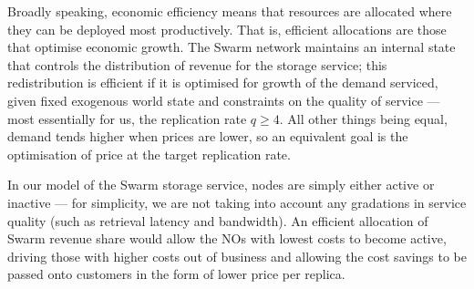 Broadly speaking, economic efficiency means that resources are allocated where they can be deployed most productively.
%
That is, efficient allocations are those that optimise economic growth.
%
The Swarm network maintains an internal state that controls the distribution of revenue for the storage service; this redistribution is efficient if it is optimised for growth of the demand serviced, given fixed exogenous world state and constraints on the quality of service --- most essentially for us, the replication rate $q\geq 4$.
%
All other things being equal, demand tends higher when prices are lower, so an equivalent goal is the optimisation of price at the target replication rate.

In our model of the Swarm storage service, nodes are simply either active or inactive --- for simplicity, we are not taking into account any gradations in service quality (such as retrieval latency and bandwidth).
%
An efficient allocation of Swarm revenue share would allow the NOs with lowest costs to become active, driving those with higher costs out of business and allowing the cost savings to be passed onto customers in the form of lower price per replica.



\begin{comment}
Since for the purposes of this work, the service provided by each Swarm node is assumed to be of constant quality --- it's either on or off --- profit margins, and hence productivity, of a node operator, depend only on operating costs.
%
On the other hand, the quality of service \emph{received} by storage clients is a function of the replication rate, a proxy for durability.

Let $D(p,q)$ be the number of units of (potential) demand at price $p$ and QoS $q$.
%
If we focus attention on one neighbourhood and normalise size units to the neighbourhood, $D(p,q)\in[\frac{1}{2},1]$.\footnote{This makes sense only if we assume that total demand remains within $[2^D,2^{D+1}]$ in the region of analysis.}
%
Usually, $D$ is decreasing in $p$ and increasing in $q$, though we expect it to be bounded in $q$.

Similarly, let $S(p;\xi)$ be the number of units supplied at price $p$ given stake registry state $\xi$.
%
Since storage providers are indifferent to the contents of the chunks they host, replicas count the same as distinct chunks.
%
So 

If we restrict attention to an individual neighbourhood and use the neighbourhood capacity (16GiB) as a unit, $S(p;\xi)\in[\frac{q}{2},q]$, where $q$ is the replication rate of the neighbourhood.
%
If we further assume that operating costs do not depend on the fraction of the reserve (within $[\frac{1}{2},1]$) that is used --- that is, NOs must reserve the same amount of computational resources regardless of the reserve state --- then in fact $S(p;\xi) = q(\xi)$ is simply the number of nodes that can operate profitably in world state $\xi$.


The microeconomic equilibrium equation is
\[
  q D(p,q) = S(p;\xi).
\]
\end{comment}

